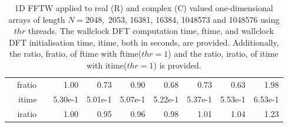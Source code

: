 \documentclass[a4paper]{article}
\begin{document}
\begin{table}[!htbp]
\begin{center}
\begin{small}
\begin{tabular}{|r|r|r|r|r|r|r|r|r|r|}
      & fratio & & 1.00 &   0.73 &  0.90 &  0.68 &  0.73 &  0.63 &  1.98  \\
     & itime & &  5.30e-1 &   5.01e-1 &   5.07e-1 &   5.22e-1 &   5.37e-1 &   5.53e-1 &   6.53e-1   \\ 
 & iratio & &  1.00 &   0.95 &  0.96 &  0.98 &  1.01 &   1.04 &   1.23  \\  \hline 
\end{tabular}
\caption{1D FFTW applied to real (R) and complex (C) valued one-dimensional arrays of length $N=2048,$ 2053, 16381, 16384, 1048573 and 1048576 using $thr$ threads. The wallclock DFT computation time, ftime, and wallclock DFT initialisation time, itime, both in seconds, are provided. Additionally,  the ratio, fratio, of ftime  with ftime($thr=1$) and the ratio, iratio, of itime  with itime($thr=1$) is provided. }\label{TblFFTW1d}
\end{small}
\end{center}
\end{table}
\end{document}
